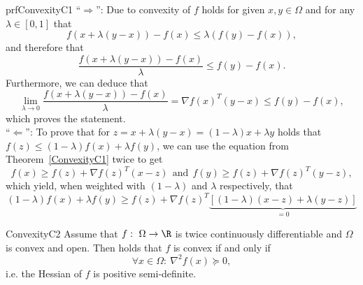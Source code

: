 \begin{prf}{prfConvexityC1}
    ``$\Rightarrow$'': Due to convexity of $f$ holds for given $x,y \in \Omega$  and for any $\lambda \in [0,1]$ that
    \begin{equation*}
        f(x + \lambda(y-x)) - f(x) \leq \lambda(f(y) - f(x)),
    \end{equation*}
    and therefore that 
    \begin{equation*}
         \frac{f(x + \lambda(y-x)) - f(x)}{\lambda} \leq f(y) - f(x).
    \end{equation*}
    Furthermore, we can deduce that
    \begin{equation*}
            \lim_{\lambda \rightarrow 0}  \frac{f(x + \lambda(y-x)) - f(x)}{\lambda} = \nabla f(x)^T(y-x) 
            \leq f(y) - f(x),
    \end{equation*}
    which proves the statement. \\

    ``$\Leftarrow$'': To prove that for $z = x + \lambda(y-x) = (1-\lambda)x + \lambda y$ holds that $f(z) \leq (1-\lambda)f(x) + \lambda f(y)$, we can use the equation from Theorem~\ref{ConvexityC1} twice to get
    \begin{equation*}
        f(x) \geq f(z) + \nabla f(z)^T(x-z) \ \ \text{and} \ \ f(y) \geq f(z) + \nabla f(z)^T(y-z),
    \end{equation*}
    which yield, when weighted with $(1-\lambda)$ and $\lambda$ respectively, that
    \begin{equation*}
        (1-\lambda)f(x) + \lambda f(y) \geq f(z) + \nabla f(z)^T \underset{= 0}{\underbrace{\left[(1-\lambda)(x-z) + \lambda(y-z)\right]}}
    \end{equation*}
    \vspace{-0.75cm}
\end{prf}

\begin{theo}{ConvexityC2}
    Assume that $f: \ \Omega \rightarrow \R$ is twice continuously differentiable and $\Omega$ is convex and open. Then holds that $f$ is convex if and only if
    \begin{equation*}
        \forall x \in \Omega: \ \nabla^2 f(x) \succeq 0,
    \end{equation*}
    i\@.e\@. the Hessian of $f$ is positive semi-definite.
\end{theo}

\newpage

